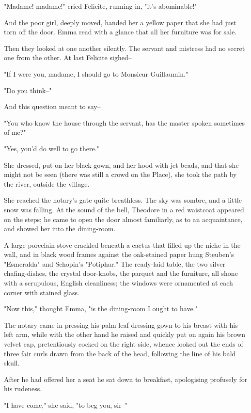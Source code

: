 \documentclass[11pt,twocolumn]{ltugboat}
\begin{document}
"Madame! madame!" cried Felicite, running in, "it's abominable!"

And the poor girl, deeply moved, handed her a yellow paper that she had
just torn off the door. Emma read with a glance that all her furniture
was for sale.

Then they looked at one another silently. The servant and mistress had
no secret one from the other. At last Felicite sighed--

"If I were you, madame, I should go to Monsieur Guillaumin."

"Do you think--"

And this question meant to say--

"You who know the house through the servant, has the master spoken
sometimes of me?"

"Yes, you'd do well to go there."

She dressed, put on her black gown, and her hood with jet beads, and
that she might not be seen (there was still a crowd on the Place), she
took the path by the river, outside the village.

She reached the notary's gate quite breathless. The sky was sombre, and
a little snow was falling. At the sound of the bell, Theodore in a
red waistcoat appeared on the steps; he came to open the door almost
familiarly, as to an acquaintance, and showed her into the dining-room.

A large porcelain stove crackled beneath a cactus that filled up the
niche in the wall, and in black wood frames against the oak-stained
paper hung Steuben's "Esmeralda" and Schopin's "Potiphar." The
ready-laid table, the two silver chafing-dishes, the crystal door-knobs,
the parquet and the furniture, all shone with a scrupulous, English
cleanliness; the windows were ornamented at each corner with stained
glass.

"Now this," thought Emma, "is the dining-room I ought to have."

The notary came in pressing his palm-leaf dressing-gown to his breast
with his left arm, while with the other hand he raised and quickly put
on again his brown velvet cap, pretentiously cocked on the right side,
whence looked out the ends of three fair curls drawn from the back of
the head, following the line of his bald skull.

After he had offered her a seat he sat down to breakfast, apologising
profusely for his rudeness.

"I have come," she said, "to beg you, sir--"
\end{document}
